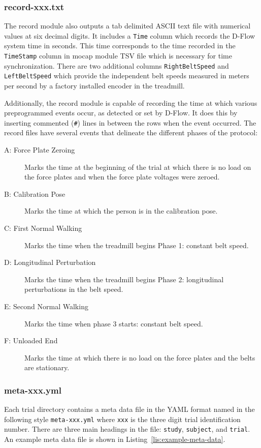 \documentclass[fleqn,12pt]{wlpeerj}
\begin{document}
\subsubsection*{record-xxx.txt}
%
The record module also outputs a tab delimited ASCII text file with numerical
values at six decimal digits. It includes a \verb+Time+ column which records
the D-Flow system time in seconds. This time corresponds to the time recorded
in the \verb+TimeStamp+ column in mocap module TSV file which is necessary for
time synchronization. There are two additional columns \verb+RightBeltSpeed+
and \verb+LeftBeltSpeed+ which provide the independent belt speeds measured in
meters per second by a factory installed encoder in the treadmill.

Additionally, the record module is capable of recording the time at which
various preprogrammed events occur, as detected or set by D-Flow. It does this
by inserting commented (\verb|#|) lines in between the rows when the event
occurred. The record files have several events that delineate the different
phases of the protocol:
%
\begin{description}
  \item[A: Force Plate Zeroing] Marks the time at the beginning of the trial at
    which there is no load on the force plates and when the force plate
    voltages were zeroed.
  \item[B: Calibration Pose] Marks the time at which the person is in the
    calibration pose.
  \item[C: First Normal Walking] Marks the time when the treadmill begins Phase
    1: constant belt speed.
  \item[D: Longitudinal Perturbation] Marks the time when the treadmill begins
    Phase 2: longitudinal perturbations in the belt speed.
  \item[E: Second Normal Walking] Marks the time when phase 3 starts: constant
    belt speed.
  \item[F: Unloaded End] Marks the time at which there is no load on the force
    plates and the belts are stationary.
\end{description}

\subsubsection*{meta-xxx.yml}

Each trial directory contains a meta data file in the YAML format named in the
following style \verb|meta-xxx.yml| where \verb|xxx| is the three digit trial
identification number. There are three main headings in the file: \verb+study+,
\verb+subject+, and \verb+trial+. An example meta data file is shown in
Listing~\ref{lis:example-meta-data}.
\end{document}
